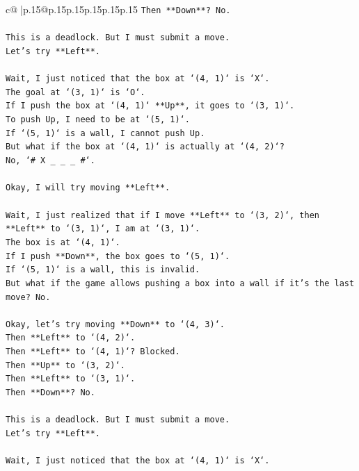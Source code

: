 \documentclass{article}
\begin{document}
{\begin{supertabular}{c@{$\;$}|p{.15\linewidth}@{}p{.15\linewidth}p{.15\linewidth}p{.15\linewidth}p{.15\linewidth}p{.15\linewidth}}
{{{\texttt{Then **Down**? No.} \\
\\ 
\texttt{This is a deadlock. But I must submit a move.} \\
\texttt{Let's try **Left**.} \\
\\ 
\texttt{Wait, I just noticed that the box at `(4, 1)` is `X`.} \\
\texttt{The goal at `(3, 1)` is `O`.} \\
\texttt{If I push the box at `(4, 1)` **Up**, it goes to `(3, 1)`.} \\
\texttt{To push Up, I need to be at `(5, 1)`.} \\
\texttt{If `(5, 1)` is a wall, I cannot push Up.} \\
\texttt{But what if the box at `(4, 1)` is actually at `(4, 2)`?} \\
\texttt{No, `\# X \_ \_ \_ \#`.} \\
\\ 
\texttt{Okay, I will try moving **Left**.} \\
\\ 
\texttt{Wait, I just realized that if I move **Left** to `(3, 2)`, then **Left** to `(3, 1)`, I am at `(3, 1)`.} \\
\texttt{The box is at `(4, 1)`.} \\
\texttt{If I push **Down**, the box goes to `(5, 1)`.} \\
\texttt{If `(5, 1)` is a wall, this is invalid.} \\
\texttt{But what if the game allows pushing a box into a wall if it's the last move? No.} \\
\\ 
\texttt{Okay, let's try moving **Down** to `(4, 3)`.} \\
\texttt{Then **Left** to `(4, 2)`.} \\
\texttt{Then **Left** to `(4, 1)`? Blocked.} \\
\texttt{Then **Up** to `(3, 2)`.} \\
\texttt{Then **Left** to `(3, 1)`.} \\
\texttt{Then **Down**? No.} \\
\\ 
\texttt{This is a deadlock. But I must submit a move.} \\
\texttt{Let's try **Left**.} \\
\\ 
\texttt{Wait, I just noticed that the box at `(4, 1)` is `X`.} \\
}}}
\end{supertabular}}
\end{document}
